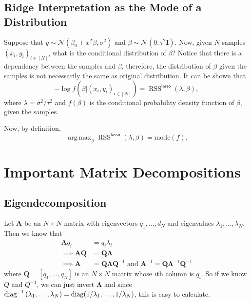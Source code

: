 \documentclass[11pt]{article}
\theoremstyle{definition}
\renewcommand{\AA}{\mathbf{A}}
\newcommand{\QQ}{\mathbf{Q}}
\newcommand{\LL}{\mathbf{\Lambda}}
\newcommand{\II}{\mathbf{I}}
\newcommand{\lasso}{\textsf{lasso}}
\newcommand{\Normal}[2]{\ensuremath{\mathcal N (#1, #2)}}
\DeclareMathOperator*{\argmax}{arg\,max}
\DeclareMathOperator*{\RSS}{RSS} \DeclareMathOperator*{\WRSS}{WRSS}
\begin{document}
\subsection{Ridge Interpretation as the Mode of a Distribution}
Suppose that $y\sim \Normal{\beta_0+x^T\beta}{\sigma^2}$ and
$\beta\sim\Normal{0}{\tau^2 \II}$. Now, given $N$ samples $(x_i,y_i)_{i\in[N]}$,
what is the conditional distribution of $\beta$? Notice that there is a
dependency between the samples and $\beta$, therefore, the distribution of
$\beta$ given the samples is not necessarily the same as original distribution.
It can be shown that
\[-\log f(\beta|(x_i,y_i)_{i\in[N]})=\RSS^\lasso(\lambda,\beta),\] where
$\lambda=\sigma^2/\tau^2$ and $f(\beta)$ is the conditional probability density
function of $\beta$, given the samples.

Now, by definition,
\[\argmax_\beta\RSS^\lasso(\lambda,\beta) = \text{mode}(f).\]


\section{Important Matrix Decompositions}

\subsection{Eigendecomposition}
Let $\AA$ be an $N\times N$ matrix with eigenvectors $q_1,\ldots,d_N$ and
eigenvalues $\lambda_1,\ldots,\lambda_N$. Then we know that
\begin{equation}
	\begin{split}
		\AA q_i &=  q_i\lambda_i \\
		\implies\AA\QQ &= \QQ\LL \\
		\implies\AA &= \QQ\LL\QQ^{-1}\text{ and }\AA^{-1}=\QQ\LL^{-1}\QQ^{-1}
	\end{split}
\end{equation}
where $\QQ=[q_1,\ldots,q_N]$ is an $N\times N$ matrix whose $i$th column is
$q_i$. So if we know $Q$ and $Q^{-1}$, we can just invert $\LL$ and since
$\operatorname*{diag}^{-1}{(\lambda_1,\ldots,\lambda_N)}=\operatorname*{diag}(1/\lambda_1,\ldots,1/\lambda_N)$,
this is easy to calculate.
\end{document}
